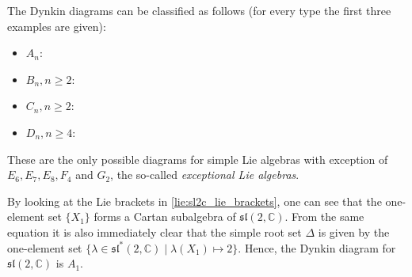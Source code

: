     \begin{property}[Classification]
        The Dynkin diagrams can be classified as follows (for every type the first three examples are given):
        \begin{itemize}
            \item $A_n$: \begin{center}\dynk {}  \end{center}
        \item $B_n,n\geq2$: \begin{center}   \end{center}
        \item $C_n,n\geq2$: \begin{center}   \end{center}
        \item $D_n,n\geq4$: \begin{center}   \end{center}
        \end{itemize}
        These are the only possible diagrams for simple Lie algebras with exception of $E_6,E_7,E_8,F_4$ and $G_2$, the so-called \textit{exceptional Lie algebras}.
    \end{property}

    \begin{example}
        By looking at the Lie brackets in \cref{lie:sl2c_lie_brackets}, one can see that the one-element set $\{X_1\}$ forms a Cartan subalgebra of $\mathfrak{sl}(2,\mathbb{C})$. From the same equation it is also immediately clear that the simple root set $\Delta$ is given by the one-element set $\{\lambda\in\mathfrak{sl}^*(2,\mathbb{C})\mid\lambda(X_1)\mapsto 2\}$. Hence, the Dynkin diagram for $\mathfrak{sl}(2,\mathbb{C})$ is $A_1$.
    \end{example}

